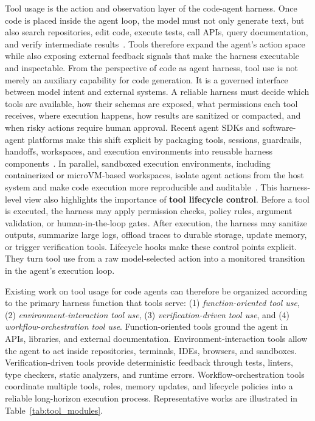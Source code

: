 \documentclass{llmxive}
\begin{document}
Tool usage is the action and observation layer of the code-agent harness. Once code is placed inside the agent loop, the model must not only generate text, but also search repositories, edit code, execute tests, call APIs, query documentation, and verify intermediate results~\cite{watanabe2025use,sapkota2025vibe}. Tools therefore expand the agent's action space while also exposing external feedback signals that make the harness executable and inspectable. From the perspective of code as agent harness, tool use is not merely an auxiliary capability for code generation. It is a governed interface between model intent and external systems. A reliable harness must decide which tools are available, how their schemas are exposed, what permissions each tool receives, where execution happens, how results are sanitized or compacted, and when risky actions require human approval. Recent agent SDKs and software-agent platforms make this shift explicit by packaging tools, sessions, guardrails, handoffs, workspaces, and execution environments into reusable harness components~\cite{wang2024openhands,meng2026agent,xi2025agentgym}. In parallel, sandboxed execution environments, including containerized or microVM-based workspaces, isolate agent actions from the host system and make code execution more reproducible and auditable~\cite{cheng2026llm,wang2024executable,wang2025ui}.
This harness-level view also highlights the importance of \textbf{tool lifecycle control}. Before a tool is executed, the harness may apply permission checks, policy rules, argument validation, or human-in-the-loop gates. After execution, the harness may sanitize outputs, summarize large logs, offload traces to durable storage, update memory, or trigger verification tools. Lifecycle hooks make these control points explicit. They turn tool use from a raw model-selected action into a monitored transition in the agent's execution loop.



Existing work on tool usage for code agents can therefore be organized according to the primary harness function that tools serve: (1) \textit{function-oriented tool use}, (2) \textit{environment-interaction tool use}, (3) \textit{verification-driven tool use}, and (4) \textit{workflow-orchestration tool use}. 
Function-oriented tools ground the agent in APIs, libraries, and external documentation. Environment-interaction tools allow the agent to act inside repositories, terminals, IDEs, browsers, and sandboxes. Verification-driven tools provide deterministic feedback through tests, linters, type checkers, static analyzers, and runtime errors. Workflow-orchestration tools coordinate multiple tools, roles, memory updates, and lifecycle policies into a reliable long-horizon execution process.
Representative works are illustrated in Table~\ref{tab:tool_modules}.
\end{document}
